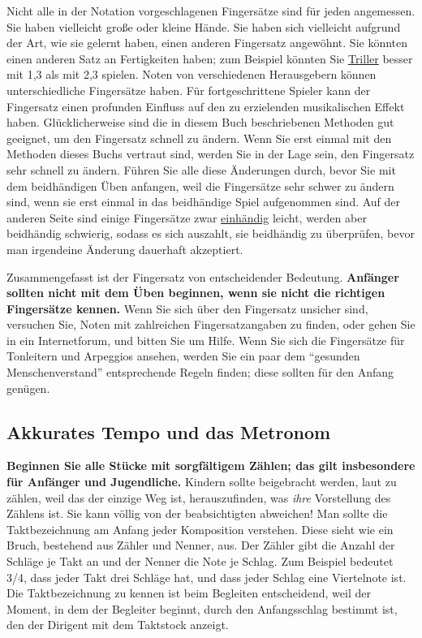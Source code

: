 Nicht alle in der Notation vorgeschlagenen Fingersätze sind für jeden angemessen.
Sie haben vielleicht große oder kleine Hände.
Sie haben sich vielleicht aufgrund der Art, wie sie gelernt haben, einen anderen Fingersatz angewöhnt.
Sie könnten einen anderen Satz an Fertigkeiten haben; zum Beispiel könnten Sie \hyperref[c1iii3]{Triller} besser mit 1,3 als mit 2,3 spielen.
Noten von verschiedenen Herausgebern können unterschiedliche Fingersätze haben.
Für fortgeschrittene Spieler kann der Fingersatz einen profunden Einfluss auf den zu erzielenden musikalischen Effekt haben.	
Glücklicherweise sind die in diesem Buch beschriebenen Methoden gut geeignet, um den Fingersatz schnell zu ändern.
Wenn Sie erst einmal mit den Methoden dieses Buchs vertraut sind, werden Sie in der Lage sein, den Fingersatz sehr schnell zu ändern.
Führen Sie alle diese Änderungen durch, bevor Sie mit dem beidhändigen Üben anfangen, weil die Fingersätze sehr schwer zu ändern sind, wenn sie erst einmal in das beidhändige Spiel aufgenommen sind.
Auf der anderen Seite sind einige Fingersätze zwar \hyperref[c1ii7]{einhändig} leicht, werden aber beidhändig schwierig, sodass es sich auszahlt, sie beidhändig zu überprüfen, bevor man irgendeine Änderung dauerhaft akzeptiert.

Zusammengefasst ist der Fingersatz von entscheidender Bedeutung. 
\textbf{Anfänger sollten nicht mit dem Üben beginnen, wenn sie nicht die richtigen Fingersätze kennen.}
Wenn Sie sich über den Fingersatz unsicher sind, versuchen Sie, Noten mit zahlreichen Fingersatzangaben zu finden, oder gehen Sie in ein Internetforum, und bitten Sie um Hilfe.
Wenn Sie sich die Fingersätze für Tonleitern und Arpeggios ansehen, werden Sie ein paar dem \enquote{gesunden Menschenverstand} entsprechende Regeln finden; diese sollten für den Anfang genügen.


\subsection{Akkurates Tempo und das Metronom}
\label{c1ii19}

\textbf{Beginnen Sie alle Stücke mit sorgfältigem Zählen; das gilt insbesondere für Anfänger und Jugendliche.}
Kindern sollte beigebracht werden, laut zu zählen, weil das der einzige Weg ist, herauszufinden, was \textit{ihre}  Vorstellung des Zählens ist.
Sie kann völlig von der beabsichtigten abweichen!
Man sollte die Taktbezeichnung am Anfang jeder Komposition verstehen.
Diese sieht wie ein Bruch, bestehend aus Zähler und Nenner, aus.
Der Zähler gibt die Anzahl der Schläge je Takt an und der Nenner die Note je Schlag.
Zum Beispiel bedeutet 3/4, dass jeder Takt drei Schläge hat, und dass jeder Schlag eine Viertelnote ist.
Die Taktbezeichnung zu kennen ist beim Begleiten entscheidend, weil der Moment, in dem der Begleiter beginnt, durch den Anfangsschlag bestimmt ist, den der Dirigent mit dem Taktstock anzeigt.

